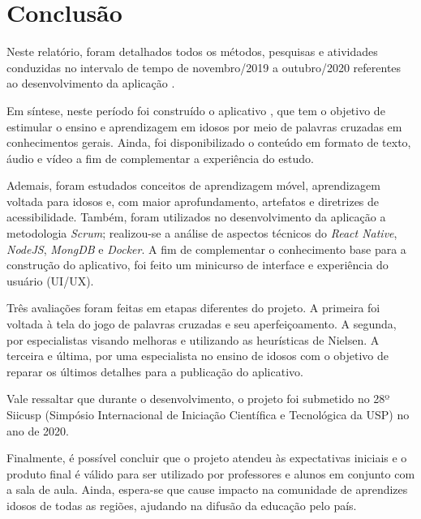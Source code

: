 \chapter{Conclusão} \label{sec:conclusao}
Neste relatório, foram detalhados todos os métodos, pesquisas e atividades conduzidas no intervalo de tempo de novembro/2019 a outubro/2020 referentes ao desenvolvimento da aplicação \crossword.

Em síntese, neste período foi construído o aplicativo \crossword, que tem o objetivo de estimular o ensino e aprendizagem em idosos por meio de palavras cruzadas em conhecimentos gerais. Ainda, foi disponibilizado o conteúdo em formato de texto, áudio e vídeo a fim de complementar a experiência do estudo.

Ademais, foram estudados conceitos de aprendizagem móvel, aprendizagem voltada para idosos e, com maior aprofundamento, artefatos e diretrizes de acessibilidade. Também, foram utilizados no desenvolvimento da aplicação \crossword a metodologia \textit{Scrum}; realizou-se a análise de aspectos técnicos do \textit{React Native}, \textit{NodeJS}, \textit{MongDB} e \textit{Docker}. A fim de complementar o conhecimento base para a construção do aplicativo, foi feito um minicurso de interface e experiência do usuário (UI/UX).

Três avaliações foram feitas em etapas diferentes do projeto. A primeira foi voltada à tela do jogo de palavras cruzadas e seu aperfeiçoamento. A segunda, por especialistas visando melhoras e utilizando as heurísticas de Nielsen. A terceira e última, por uma especialista no ensino de idosos com o objetivo de reparar os últimos detalhes para a publicação do aplicativo.

Vale ressaltar que durante o desenvolvimento, o projeto foi submetido no 28º Siicusp (Simpósio Internacional de Iniciação Científica e Tecnológica da USP) no ano de 2020.

Finalmente, é possível concluir que o projeto atendeu às expectativas iniciais e o produto final é válido para ser utilizado por professores e alunos em conjunto com a sala de aula. 
Ainda, espera-se que cause impacto na comunidade de aprendizes idosos de todas as regiões, ajudando na difusão da educação pelo país.